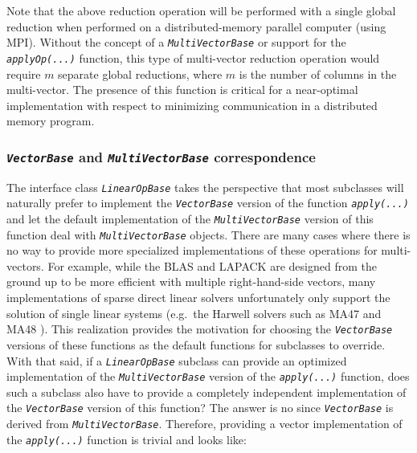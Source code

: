 \documentclass[pdf,ps2pdf,11pt]{SANDreport}
\begin{document}
{}\noindent{}Note that the above reduction operation will be performed
with a single global reduction when performed on a distributed-memory
parallel computer (using MPI).  Without the concept of a
{}\texttt{\textit{Multi\-Vector\-Base}} or support for the
{}\texttt{\textit{applyOp(\-...)}} function, this type of multi-vector
reduction operation would require $m$ separate global reductions,
where $m$ is the number of columns in the multi-vector.  The presence
of this function is critical for a near-optimal implementation with
respect to minimizing communication in a distributed memory program.

%
\subsubsection{\texttt{\textit{Vector\-Base}} and {}\texttt{\textit{Multi\-Vector\-Base}} correspondence}
\label{tsfcore:sec:vector_vs_multivector}
%

The interface class {}\texttt{\textit{Linear\-Op\-Base}} takes the perspective
that most subclasses will naturally prefer to implement the
{}\texttt{\textit{Vector\-Base}} version of the function
{}\texttt{\textit{apply(\-...)}} and let the default implementation of
the {}\texttt{\textit{Multi\-Vector\-Base}} version of this function deal with
{}\texttt{\textit{Multi\-Vector\-Base}} objects.  There are many cases where
there is no way to provide more specialized implementations of these
operations for multi-vectors.  For example, while the BLAS and LAPACK
are designed from the ground up to be more efficient with multiple
right-hand-side vectors, many implementations of sparse direct linear
solvers unfortunately only support the solution of single linear
systems (e.g.~the Harwell solvers such as MA47 and MA48
{}\cite{ref:hsl_1995}).  This realization provides the motivation for
choosing the {}\texttt{\textit{Vector\-Base}} versions of these functions as
the default functions for subclasses to override.  With that said, if a
{}\texttt{\textit{Linear\-Op\-Base}} subclass can provide an optimized
implementation of the {}\texttt{\textit{Multi\-Vector\-Base}} version of the
{}\texttt{\textit{apply(\-...)}} function, does such a subclass also
have to provide a completely independent implementation of the
{}\texttt{\textit{Vector\-Base}} version of this function?  The answer is no
since {}\texttt{\textit{Vector\-Base}} is derived from
{}\texttt{\textit{Multi\-Vector\-Base}}.  Therefore, providing a vector
implementation of the {}\texttt{\textit{apply(\-...)}} function
is trivial and looks like:
\end{document}
